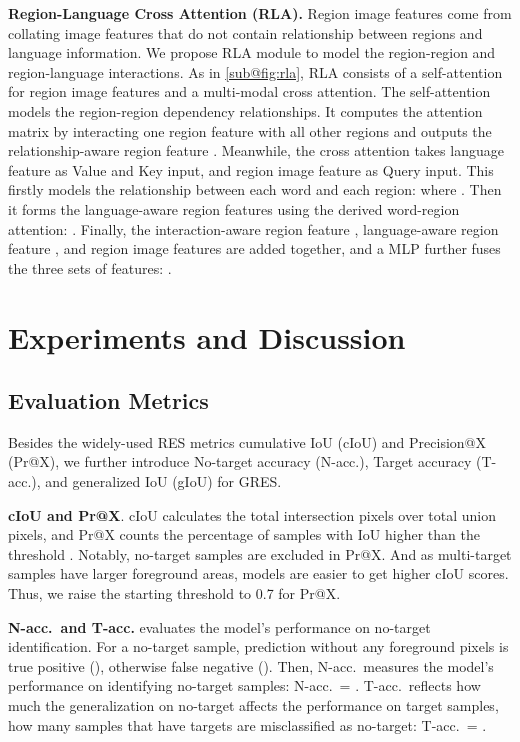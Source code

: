\documentclass[10pt,twocolumn,letterpaper]{article}
\newcommand{\ntacc}{N-acc.\xspace}
\newcommand{\tacc}{T-acc.\xspace}
\let\oldsubsection\subsection
\renewcommand{\subsection}[1]{\oldsubsection{#1} }
\begin{document}
\textbf{Region-Language Cross Attention (RLA).} Region image features  come from collating image features that do not contain relationship between regions and language information. We propose RLA module to model the region-region and region-language interactions. As in \cref{sub@fig:rla}, RLA consists of a self-attention for region image features  and a multi-modal cross attention. The self-attention models the region-region dependency relationships. It computes the attention matrix by interacting one region feature with all other regions and outputs the relationship-aware region feature . Meanwhile, the cross attention takes language feature  as Value and Key input, and region image feature  as Query input. This firstly models the relationship between each word and each region: 
\vspace{-1mm}
where . Then it forms the language-aware region features using the derived word-region attention: . Finally, the interaction-aware region feature , language-aware region feature , and region image features  are added together, and a MLP further fuses the three sets of features: .




\section{Experiments and Discussion}

\subsection{Evaluation Metrics} \label{sec:metrics}


Besides the widely-used RES metrics cumulative IoU (cIoU) and Precision@X (Pr@X), we further introduce No-target accuracy (\ntacc), Target accuracy (\tacc), and generalized IoU (gIoU) for GRES.


\textbf{cIoU and Pr@X}. cIoU calculates the total intersection pixels over total union pixels, and Pr@X counts the percentage of samples with IoU higher than the threshold . Notably, no-target samples are excluded in Pr@X. And as multi-target samples have larger foreground areas, models are easier to get higher cIoU scores. Thus, we raise the starting threshold to 0.7 for Pr@X.

\textbf{\ntacc\ and \tacc} evaluates the model's performance on no-target identification. For a no-target sample, prediction without any foreground pixels is true positive (), otherwise false negative (). Then, \ntacc~measures the model's performance on identifying no-target samples: \ntacc~= . \tacc~reflects how much the generalization on no-target affects the performance on target samples, \ie how many samples that have targets are misclassified as no-target: \tacc~= .
\end{document}
